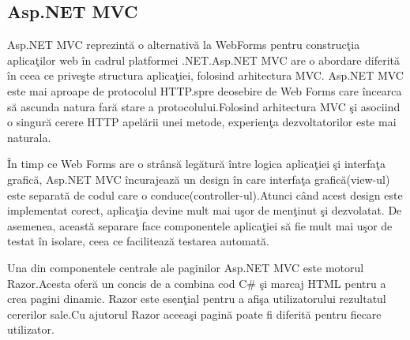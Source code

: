 \documentclass[a4paper,12pt]{report}
\begin{document}
\subsection{Asp.NET MVC}
Asp.NET MVC reprezint\u a o alternativ\u a la WebForms pentru construc\c tia aplica\c tilor web \^in cadrul
platformei .NET.Asp.NET MVC are o abordare diferit\u a \^in ceea ce prive\c ste structura aplica\c tiei, folosind
arhitectura MVC.
Asp.NET MVC este mai aproape de protocolul HTTP.spre deosebire de Web Forms care \^incearca s\u a ascunda 
natura far\u a stare a protocolului.Folosind arhitectura MVC \c si asociind o singur\u a cerere HTTP apel\u arii 
unei metode, experien\c ta dezvoltatorilor este mai naturala.

\^In timp ce Web Forms are o str\^ans\u a leg\u atur\u a \^intre logica aplica\c tiei \c si interfa\c ta grafic\u a,
Asp.NET MVC \^incurajeaz\u a un design \^in care interfa\c ta grafic\u a(view-ul) este separat\u a de codul
care o conduce(controller-ul).Atunci c\^and acest design este implementat corect, aplica\c tia devine mult mai u\c sor de men\c tinut
\c si dezvolatat.
De asemenea, aceast\u a separare face componentele aplica\c tiei s\u a fie mult mai u\c sor de testat \^in isolare,
ceea ce faciliteaz\u a testarea automat\u a.

Una din componentele centrale ale paginilor Asp.NET MVC este motorul Razor.Acesta ofer\u a un concis
de a combina cod C\# \c si marcaj HTML pentru a crea pagini dinamic. Razor este esen\c tial pentru a afi\c sa 
utilizatorului rezultatul cererilor sale.Cu ajutorul Razor aceea\c si pagin\u a poate fi diferit\u a pentru 
fiecare utilizator.
\end{document}
